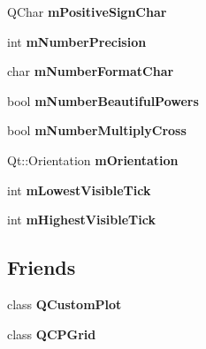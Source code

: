 \begin{DoxyCompactItemize}
\item 
\hypertarget{classQCPAxis_ae99d47103ec8ba66959205b23991241b}{Q\-Char {\bfseries m\-Positive\-Sign\-Char}}\label{classQCPAxis_ae99d47103ec8ba66959205b23991241b}

\item 
\hypertarget{classQCPAxis_acd76e8c783384d99ccc4a13797eec188}{int {\bfseries m\-Number\-Precision}}\label{classQCPAxis_acd76e8c783384d99ccc4a13797eec188}

\item 
\hypertarget{classQCPAxis_a600d56365316ea783927f7d595f1ed54}{char {\bfseries m\-Number\-Format\-Char}}\label{classQCPAxis_a600d56365316ea783927f7d595f1ed54}

\item 
\hypertarget{classQCPAxis_af03809bee3f3e35fcc38d25b6dd5003b}{bool {\bfseries m\-Number\-Beautiful\-Powers}}\label{classQCPAxis_af03809bee3f3e35fcc38d25b6dd5003b}

\item 
\hypertarget{classQCPAxis_aebf0367d8645d2e05b93a0952b7e805b}{bool {\bfseries m\-Number\-Multiply\-Cross}}\label{classQCPAxis_aebf0367d8645d2e05b93a0952b7e805b}

\item 
\hypertarget{classQCPAxis_a048e1792fa86f4f86df55200b3f0be36}{Qt\-::\-Orientation {\bfseries m\-Orientation}}\label{classQCPAxis_a048e1792fa86f4f86df55200b3f0be36}

\item 
\hypertarget{classQCPAxis_aebb24ba8734b7e054efc6e1ecc5414c7}{int {\bfseries m\-Lowest\-Visible\-Tick}}\label{classQCPAxis_aebb24ba8734b7e054efc6e1ecc5414c7}

\item 
\hypertarget{classQCPAxis_abb3b3ccce7e9779fef2be91ce1a46ef0}{int {\bfseries m\-Highest\-Visible\-Tick}}\label{classQCPAxis_abb3b3ccce7e9779fef2be91ce1a46ef0}

\end{DoxyCompactItemize}
\subsection*{Friends}
\begin{DoxyCompactItemize}
\item 
\hypertarget{classQCPAxis_a1cdf9df76adcfae45261690aa0ca2198}{class {\bfseries Q\-Custom\-Plot}}\label{classQCPAxis_a1cdf9df76adcfae45261690aa0ca2198}

\item 
\hypertarget{classQCPAxis_a061e177f585549fc31f780852e2bd6fe}{class {\bfseries Q\-C\-P\-Grid}}\label{classQCPAxis_a061e177f585549fc31f780852e2bd6fe}

\end{DoxyCompactItemize}


